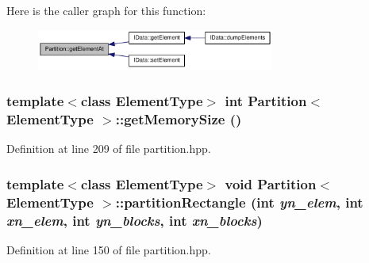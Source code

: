 Here is the caller graph for this function:\nopagebreak
\begin{figure}[H]
\begin{center}
\leavevmode
\includegraphics[width=221pt]{class_partition_aad83ba7499b811fd266fdfd97d38204c_icgraph}
\end{center}
\end{figure}
\hypertarget{class_partition_a38b3de8d91758c1b15082601d949bb85}{
\subsubsection[{getMemorySize}]{\setlength{\rightskip}{0pt plus 5cm}template$<$class ElementType$>$ int {\bf Partition}$<$ ElementType $>$::getMemorySize ()}}
\label{class_partition_a38b3de8d91758c1b15082601d949bb85}


Definition at line 209 of file partition.hpp.\hypertarget{class_partition_a5ca98c67580ef12ca1b2376638fb9714}{
\subsubsection[{partitionRectangle}]{\setlength{\rightskip}{0pt plus 5cm}template$<$class ElementType$>$ void {\bf Partition}$<$ ElementType $>$::partitionRectangle (int {\em yn\_\-elem}, \/  int {\em xn\_\-elem}, \/  int {\em yn\_\-blocks}, \/  int {\em xn\_\-blocks})}}
\label{class_partition_a5ca98c67580ef12ca1b2376638fb9714}


Definition at line 150 of file partition.hpp.

